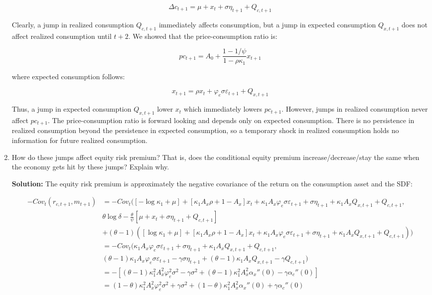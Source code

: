 \documentclass{article}
\begin{document}
\begin{enumerate}
$$
\Delta c_{t+1} = \mu + x_t + \sigma \eta_{t+1} + Q_{c,t+1}
$$

Clearly, a jump in realized consumption $Q_{c,t+1}$ immediately affects consumption, but a jump in expected consumption $Q_{x,t+1}$ does not affect realized consumption until $t+2$.  We showed that the price-consumption ratio is:

$$
pc_{t+1} = A_0 + \frac{1 - 1/\psi}{1 - \rho \kappa_1} x_{t+1}
$$

where expected consumption follows:

$$
x_{t+1} = \rho x_t + \varphi_e \sigma \varepsilon_{t+1} + Q_{x,t+1}
$$

Thus, a jump in expected consumption $Q_{x,t+1}$ lower $x_t$ which immediately lowers $pc_{t+1}$.  However, jumps in realized consumption never affect $pc_{t+1}$.  The price-consumption ratio is forward looking and depends only on expected consumption.  There is no persistence in realized consumption beyond the persistence in expected consumption, so a temporary shock in realized consumption holds no information for future realized consumption.

\item How do these jumps affect equity risk premium? That is, does the conditional equity premium increase/decrease/stay the same when the economy gets hit by these jumps? Explain why.

\textbf{Solution:} The equity risk premium is approximately the negative covariance of the return on the consumption asset and the SDF:

\begin{align*}
-Cov_t(r_{c,t+1}, m_{t+1}) 
&= -Cov_t([-\log \kappa_1 + \mu] + [\kappa_1 A_x \rho  + 1 - A_x] x_t + \kappa_1 A_x \varphi_e \sigma \varepsilon_{t+1} + \sigma \eta_{t+1} + \kappa_1 A_x Q_{x,t+1} + Q_{c,t+1}, \\
&\theta \log \delta - \frac{\theta}{\psi} [\mu + x_t + \sigma \eta_{t+1} + Q_{c,t+1}] \\
&+ (\theta - 1) ([\log \kappa_1 + \mu] + [\kappa_1 A_x \rho  + 1 - A_x] x_t + \kappa_1 A_x \varphi_e \sigma \varepsilon_{t+1} + \sigma \eta_{t+1} + \kappa_1 A_x Q_{x,t+1} + Q_{c,t+1}))\\
&= -Cov_t(  \kappa_1 A_x \varphi_e \sigma \varepsilon_{t+1} + \sigma \eta_{t+1} + \kappa_1 A_x Q_{x,t+1} + Q_{c,t+1}, \\
&  (\theta - 1)  \kappa_1 A_x \varphi_e \sigma \varepsilon_{t+1} -\gamma \sigma \eta_{t+1} + (\theta - 1) \kappa_1 A_x Q_{x,t+1} -\gamma Q_{c,t+1})\\
&= -[(\theta - 1) \kappa_1^2 A_x^2 \varphi_e^2 \sigma^2 -\gamma \sigma^2  + (\theta - 1)\kappa_1^2 A_x^2 \alpha_x''(0) -\gamma\alpha_c''(0)]\\
&= (1 - \theta) \kappa_1^2 A_x^2 \varphi_e^2 \sigma^2  + \gamma \sigma^2  + (1 - \theta)\kappa_1^2 A_x^2 \alpha_x''(0) +\gamma\alpha_c''(0)
\end{align*}


\end{enumerate}
\end{document}
